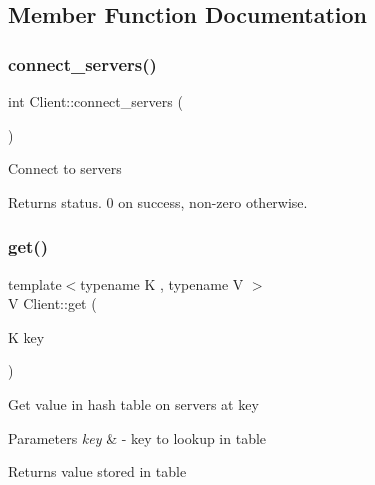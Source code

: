\subsection{Member Function Documentation}
\mbox{\label{classClient_a90a2db07daa07b38544fe3724520f4da}} 
\subsubsection{\texorpdfstring{connect\+\_\+servers()}{connect\_servers()}}
{\footnotesize\ttfamily int Client\+::connect\+\_\+servers (\begin{DoxyParamCaption}{ }\end{DoxyParamCaption})}

Connect to servers

\begin{DoxyReturn}{Returns}
status. 0 on success, non-\/zero otherwise. 
\end{DoxyReturn}
\mbox{\label{classClient_a12d1464831984d5d90358a2abb75f405}} 
\subsubsection{\texorpdfstring{get()}{get()}}
{\footnotesize\ttfamily template$<$typename K , typename V $>$ \\
V Client\+::get (\begin{DoxyParamCaption}\item[{K}]{key }\end{DoxyParamCaption})\hspace{0.3cm}{\ttfamily [inline]}}

Get value in hash table on servers at key


\begin{DoxyParams}{Parameters}
{\em key} & -\/ key to lookup in table\\
\hline
\end{DoxyParams}
\begin{DoxyReturn}{Returns}
value stored in table 
\end{DoxyReturn}
\mbox{\label{classClient_aab8dfc8e80e752a5f0c1feac7d7ec163}} 
